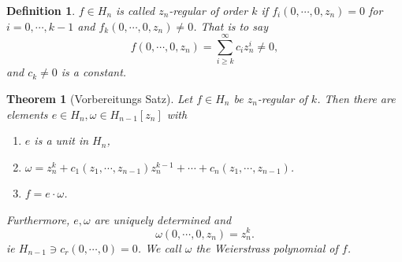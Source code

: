 \documentclass{article}
\newtheorem{theorem}{Theorem} [section]
\newtheorem{definition}{Definition}[section]
\begin{document}
\begin{definition}
  $f\in H_n$ is called $z_n$-regular of order $k$ if $f_i (0,\cdots,0,z_n) = 0$ for $i=0,\cdots,k-1$ and $f_k(0,\cdots,0,z_n)\not=0$.
  That is to say 
  \begin{equation*}
    f(0,\cdots,0,z_n) = \sum_{i\geq k}^\infty c_iz_n^i\not =0,
  \end{equation*}      
  and $c_k\not=0$ is a constant.                                                                                                
\end{definition}

\begin{theorem}[Vorbereitungs Satz]
  Let $f\in H_n$ be $z_n$-regular of $k$. Then there are elements $e\in H_n,\omega\in H_{n-1}[z_n]$ with 
  \begin{enumerate}
    \item $e$ is a unit in $H_n$,
    \item $\omega=z_n^k + c_1(z_1,\cdots,z_{n-1})z_n^{k-1}+\cdots + c_n(z_1,\cdots,z_{n-1})$.
    \item $f = e\cdot \omega$.
  \end{enumerate}
  Furthermore, $e,\omega$ are uniquely determined and 
  \begin{equation*}
    \omega(0,\cdots,0,z_n) = z_n^k.
  \end{equation*}
  ie $H_{n-1}\ni c_r(0,\cdots,0) = 0$. We call $\omega$ the Weierstrass polynomial of $f$.
\end{theorem} 
\end{document}
